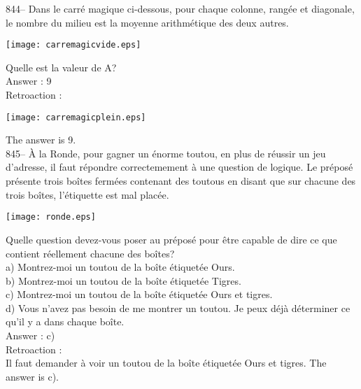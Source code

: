 ﻿\documentclass[letterpaper, 12pt]{article}
\begin{document}
844-- Dans le carr\'e magique ci-dessous, pour chaque colonne, rang\'ee et
diagonale, le nombre du milieu est la moyenne arithm\'etique des deux
autres.    \begin{center}
    \texttt{[image: carremagicvide.eps]}
    \end{center}
Quelle est la valeur de A?\\

Answer : 9\\

Retroaction : \\

    \begin{center}
    \texttt{[image: carremagicplein.eps]}
    \end{center}


The answer is 9.\\

845-- \`A la Ronde, pour gagner un \'enorme toutou, en plus de
r\'eussir un jeu d'adresse, il faut r\'epondre correctemement \`a
une question de logique.  Le pr\'epos\'e pr\'esente trois bo\^ites
ferm\'ees contenant des toutous en disant que sur chacune des trois
bo\^ites, l'\'etiquette est mal plac\'ee.
    \begin{center}
    \texttt{[image: ronde.eps]}
    \end{center}
Quelle question devez-vous poser au pr\'epos\'e pour \^etre capable de dire
ce que contient r\'eellement chacune des bo\^ites?\\
a) Montrez-moi un toutou de la bo\^ite \'etiquet\'ee \og Ours\fg .\\
b) Montrez-moi un toutou de la bo\^ite \'etiquet\'ee \og Tigres\fg .\\
c) Montrez-moi un toutou de la bo\^ite \'etiquet\'ee \og Ours et tigres\fg.\\
d) Vous n'avez pas besoin de me montrer un toutou.  Je peux d\'ej\`a
d\'eterminer ce qu'il y a dans chaque bo\^ite.\\

Answer : c)\\

Retroaction : \\
Il faut demander \`a voir un toutou de la bo\^ite \'etiquet\'ee \og
Ours et tigres\fg.  The answer is c).\\
\end{document}
